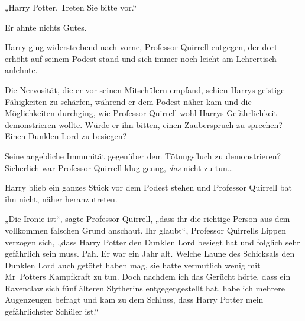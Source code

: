 „Harry Potter. Treten Sie bitte vor.“

Er ahnte nichts Gutes.

Harry ging widerstrebend nach vorne, Professor Quirrell entgegen, der dort erhöht auf seinem Podest stand und sich immer noch leicht am Lehrertisch anlehnte.

Die Nervosität, die er vor seinen Mitschülern empfand, schien Harrys geistige Fähigkeiten zu schärfen, während er dem Podest näher kam und die Möglichkeiten durchging, wie Professor Quirrell wohl Harrys Gefährlichkeit demonstrieren wollte. Würde er ihn bitten, einen Zauberspruch zu sprechen? Einen Dunklen Lord zu besiegen?

Seine angebliche Immunität gegenüber dem Tötungsfluch zu demonstrieren? Sicherlich war Professor Quirrell klug genug, \emph{das} nicht zu tun…

Harry blieb ein ganzes Stück vor dem Podest stehen und Professor Quirrell bat ihn nicht, näher heranzutreten.

„Die Ironie ist“, sagte Professor Quirrell, „dass ihr die richtige Person aus dem vollkommen falschen Grund anschaut. Ihr glaubt“, Professor Quirrells Lippen verzogen sich, „dass Harry Potter den Dunklen Lord besiegt hat und folglich sehr gefährlich sein muss. Pah. Er war ein Jahr alt. Welche Laune des Schicksals den Dunklen Lord auch getötet haben mag, sie hatte vermutlich wenig mit Mr~Potters Kampfkraft zu tun. Doch nachdem ich das Gerücht hörte, dass ein Ravenclaw sich fünf älteren Slytherins entgegengestellt hat, habe ich mehrere Augenzeugen befragt und kam zu dem Schluss, dass Harry Potter mein gefährlichster Schüler ist.“

